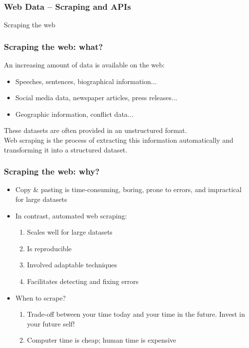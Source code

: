 \documentclass{beamer}
\begin{document}
	

  

\begin{frame}
	\frametitle{Web Data -- Scraping and APIs}

\end{frame}


\begin{frame}
	
	\centering\Huge{Scraping the web}
	
	
\end{frame}



\begin{frame}
	\frametitle{Scraping the web: what?}
	
	An increasing amount of data is available on the web:
	
	\begin{itemize}[<+->]
		\item Speeches, sentences, biographical information...
		\item Social media data, newspaper articles, press releases...
		\item Geographic information, conflict data...
	\end{itemize} 
	\onslide<+->
	\vspace{.25cm}
	These datasets are often provided in an \alert{unstructured format}. \\
	\onslide<+->
	\vspace{.25cm}
	\alert{Web scraping} is the process of extracting this information automatically and transforming it into a \alert{structured dataset.}
	
\end{frame}

\begin{frame}
	\frametitle{Scraping the web: why?}
	
	\begin{itemize}[<+->]
		\item Copy \& pasting is time-consuming, boring, prone to errors, and impractical for large datasets
		\item In contrast, automated web scraping:
		\begin{enumerate}
			\item Scales well for large datasets
			\item Is reproducible
			\item Involved adaptable techniques
			\item Facilitates detecting and fixing errors
		\end{enumerate}
		\item When to scrape? 
		\begin{enumerate}
			\item Trade-off between your time today and your time in the future. \alert{Invest in your future self!}
			\item Computer time is cheap; human time is expensive
		\end{enumerate}
	\end{itemize}
	
\end{frame}
\end{document}
